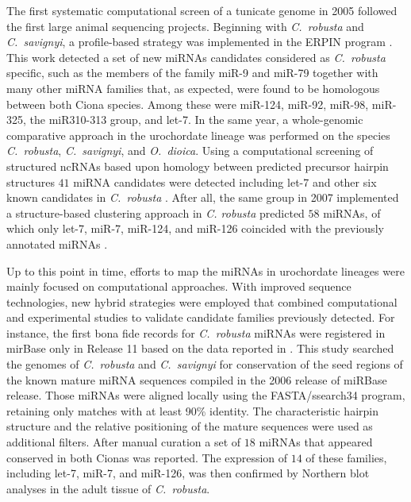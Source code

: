 \documentclass[graybox]{svmult}
\begin{document}
The first systematic computational screen of a tunicate genome in 2005
followed the first large animal sequencing projects. Beginning with
\textit{C.\ robusta} and \textit{C.\ savignyi}, a profile-based strategy
was implemented in the ERPIN program \cite{Legendre2005}. This work
detected a set of new miRNAs candidates considered as \textit{C.\ robusta}
specific, such as the members of the family miR-9 and miR-79 together with
many other miRNA families that, as expected, were found to be homologous between
both Ciona species. Among these were miR-124, miR-92, miR-98, miR-325, 
the miR310-313 group, and let-7. In the same year, a whole-genomic comparative
approach in the urochordate lineage was performed on the species
\textit{C.\ robusta}, \textit{C.\ savignyi}, and \textit{O.\ dioica}. Using a
computational screening of structured ncRNAs based upon homology between
predicted precursor hairpin structures $41$ miRNA candidates were detected
including let-7 and other six known candidates in \textit{C.\ robusta}
\cite{Missal2005}. After all, the same group in 2007 implemented a
structure-based clustering approach in \textit{C. robusta} predicted $58$
miRNAs, of which only let-7, miR-7, miR-124, and miR-126 coincided with the
previously annotated miRNAs \cite{Will2007}.

Up to this point in time, efforts to map the miRNAs in urochordate lineages
were mainly focused on computational approaches. With improved sequence
technologies, new hybrid strategies were employed that combined
computational and experimental studies to validate candidate families
previously detected. For instance, the first bona fide records for
\textit{C.\ robusta} miRNAs were registered in mirBase only in Release 11
based on the data reported in \cite{Norden-Krichmar2007}. This study
searched the genomes of \textit{C.\ robusta} and \textit{C.\ savignyi} for
conservation of the seed regions of the known mature miRNA sequences
compiled in the 2006 release of miRBase release. Those miRNAs were aligned
locally using the FASTA/ssearch34 program, retaining only matches with at
least 90\% identity. The characteristic hairpin structure and the relative
positioning of the mature sequences were used as additional filters. After
manual curation a set of $18$ miRNAs that appeared conserved in both Cionas
was reported. The expression of $14$ of these families, including let-7,
miR-7, and miR-126, was then confirmed by Northern blot analyses in the
adult tissue of \textit{C.\ robusta}.
\end{document}
